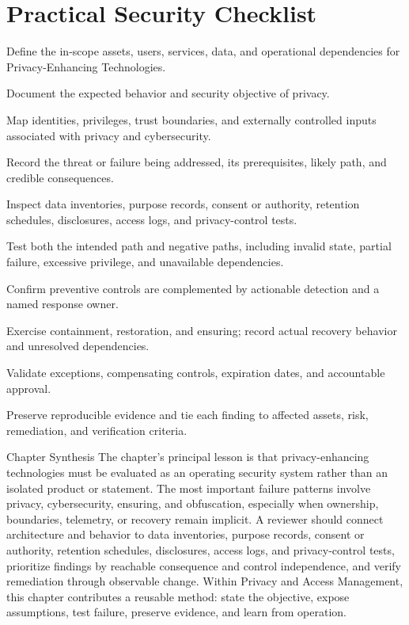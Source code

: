 \documentclass[11pt,letterpaper]{article}
\begin{document}
\section*{Practical Security Checklist}
\begin{CornellChecklist}
\item Define the in-scope assets, users, services, data, and operational dependencies for Privacy-Enhancing Technologies.
\item Document the expected behavior and security objective of privacy.
\item Map identities, privileges, trust boundaries, and externally controlled inputs associated with privacy and cybersecurity.
\item Record the threat or failure being addressed, its prerequisites, likely path, and credible consequences.
\item Inspect data inventories, purpose records, consent or authority, retention schedules, disclosures, access logs, and privacy-control tests.
\item Test both the intended path and negative paths, including invalid state, partial failure, excessive privilege, and unavailable dependencies.
\item Confirm preventive controls are complemented by actionable detection and a named response owner.
\item Exercise containment, restoration, and ensuring; record actual recovery behavior and unresolved dependencies.
\item Validate exceptions, compensating controls, expiration dates, and accountable approval.
\item Preserve reproducible evidence and tie each finding to affected assets, risk, remediation, and verification criteria.
\end{CornellChecklist}
\begin{CornellSummaryBox}{Chapter Synthesis}
The chapter's principal lesson is that privacy-enhancing technologies must be evaluated as an operating security system rather than an isolated product or statement. The most important failure patterns involve privacy, cybersecurity, ensuring, and obfuscation, especially when ownership, boundaries, telemetry, or recovery remain implicit. A reviewer should connect architecture and behavior to data inventories, purpose records, consent or authority, retention schedules, disclosures, access logs, and privacy-control tests, prioritize findings by reachable consequence and control independence, and verify remediation through observable change. Within Privacy and Access Management, this chapter contributes a reusable method: state the objective, expose assumptions, test failure, preserve evidence, and learn from operation.
\end{CornellSummaryBox}
\end{document}
